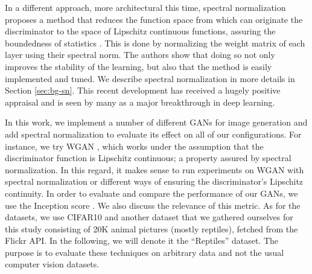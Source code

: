 In a different approach, more architectural this time, spectral normalization proposes a method that reduces the function space from which can originate the discriminator to the space of Lipschitz continuous functions, assuring the boundedness of statistics \cite{uehara2016generative}. This is done by normalizing the weight matrix of each layer using their spectral norm. The authors show that doing so not only improves the stability of the learning, but also that the method is easily implemented and tuned. We describe spectral normalization in more details in Section \ref{sec:bg-sn}. This recent development has received a hugely positive appraisal and is seen by many as a major breakthrough in deep learning.

In this work, we implement a number of different GANs for image generation and add spectral normalization \cite{miyato2018spectral} to evaluate its effect on all of our configurations. For instance, we try WGAN \cite{arjovsky2017wasserstein}, which works under the assumption that the discriminator function is Lipschitz continuous; a property assured by spectral normalization. In this regard, it makes sense to run experiments on WGAN with spectral normalization or different ways of ensuring the discriminator's Lipschitz continuity. In order to evaluate and compare the performance of our GANs, we use the Inception score \cite{salimans2016improved}. We also discuss the relevance of this metric. As for the datasets, we use CIFAR10 \cite{cifar10} and another dataset that we gathered ourselves for this study consisting of 20K animal pictures (mostly reptiles), fetched from the Flickr API. In the following, we will denote it the ``Reptiles'' dataset. The purpose is to evaluate these techniques on arbitrary data and not the usual computer vision datasets. 

